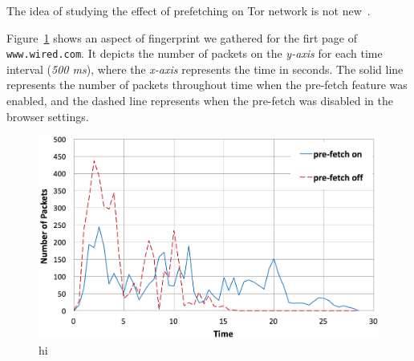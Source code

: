 The idea of studying the effect of prefetching on Tor network is not new~\cite{something}.

Figure~\ref{fig:prefetch} shows an aspect of fingerprint we gathered for the firt page of {\tt www.wired.com}.
It depicts the number of packets on the {\it y-axis} for each time interval ({\it 500 ms}), where the {\it x-axis} represents the time in seconds.
The solid line represents the number of packets throughout time when the pre-fetch feature was enabled, and the dashed line represents when the pre-fetch was disabled in the browser settings.

\begin{figure}[h]
\includegraphics[width=\columnwidth]{figures/prefetch.png}
\centering
\caption{hi}
\label{fig:prefetch}
\end{figure}



